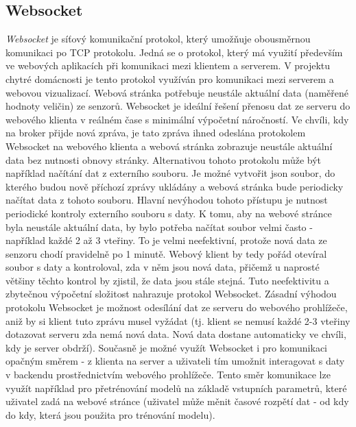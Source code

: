 \subsection*{Websocket} \label{sec:websocket}
\textit{Websocket} je síťový komunikační protokol, který umožňuje obousměrnou komunikaci po TCP protokolu. Jedná se o protokol, který má využití především ve webových aplikacích při komunikaci mezi klientem a serverem. V projektu chytré domácnosti je tento protokol využíván pro komunikaci mezi serverem a webovou vizualizací. Webová stránka potřebuje neustále aktuální data (naměřené hodnoty veličin) ze senzorů. Websocket je ideální řešení přenosu dat ze serveru do webového klienta v reálném čase s minimální výpočetní náročností. Ve chvíli, kdy na broker přijde nová zpráva, je tato zpráva ihned odeslána protokolem Websocket na webového klienta a webová stránka zobrazuje neustále aktuální data bez nutnosti obnovy stránky. Alternativou tohoto protokolu může být například načítání dat z externího souboru. Je možné vytvořit json soubor, do kterého budou nově příchozí zprávy ukládány a webová stránka bude periodicky načítat data z tohoto souboru. Hlavní nevýhodou tohoto přístupu je nutnost periodické kontroly externího souboru s daty. K tomu, aby na webové stránce byla neustále aktuální data, by bylo potřeba načítat soubor velmi často - například každé 2 až 3 vteřiny. To je velmi neefektivní, protože nová data ze senzoru chodí pravidelně po 1 minutě. Webový klient by tedy pořád otevíral soubor s daty a kontroloval, zda v něm jsou nová data, přičemž u naprosté většiny těchto kontrol by zjistil, že data jsou stále stejná. Tuto neefektivitu a zbytečnou výpočetní složitost nahrazuje protokol Websocket. Zásadní výhodou protokolu Websocket je možnost odesílání dat ze serveru do webového prohlížeče, aniž by si klient tuto zprávu musel vyžádat (tj. klient se nemusí každé 2-3 vteřiny dotazovat serveru zda nemá nová data. Nová data dostane automaticky ve chvíli, kdy je server obdrží). Současně je možné využít Websocket i pro komunikaci opačným směrem - z klienta na server a uživateli tím umožnit interagovat s daty v backendu prostřednictvím webového prohlížeče. Tento směr komunikace lze využít například pro přetrénování modelů na základě vstupních parametrů, které uživatel zadá na webové stránce (uživatel může měnit časové rozpětí dat - od kdy do kdy, která jsou použita pro trénování modelu).